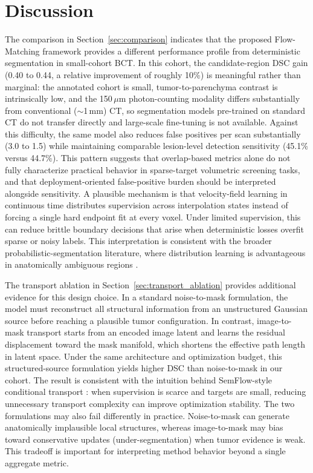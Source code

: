 \documentclass{iopjournal}
\begin{document}
\section{Discussion}
The comparison in Section~\ref{sec:comparison} indicates that the proposed Flow-Matching framework provides a different performance profile from deterministic segmentation in small-cohort BCT. In this cohort, the candidate-region DSC gain (0.40 to 0.44, a relative improvement of roughly 10\%) is meaningful rather than marginal: the annotated cohort is small, tumor-to-parenchyma contrast is intrinsically low, and the 150\,$\mu$m photon-counting modality differs substantially from conventional ($\sim$1\,mm) CT, so segmentation models pre-trained on standard CT do not transfer directly and large-scale fine-tuning is not available. Against this difficulty, the same model also reduces false positives per scan substantially (3.0 to 1.5) while maintaining comparable lesion-level detection sensitivity (45.1\% versus 44.7\%). This pattern suggests that overlap-based metrics alone do not fully characterize practical behavior in sparse-target volumetric screening tasks, and that deployment-oriented false-positive burden should be interpreted alongside sensitivity. A plausible mechanism is that velocity-field learning in continuous time distributes supervision across interpolation states instead of forcing a single hard endpoint fit at every voxel. Under limited supervision, this can reduce brittle boundary decisions that arise when deterministic losses overfit sparse or noisy labels. This interpretation is consistent with the broader probabilistic-segmentation literature, where distribution learning is advantageous in anatomically ambiguous regions \cite{schmidt2023probabilistic, wu2024medsegdiff, rahman2023ambiguous}.

The transport ablation in Section~\ref{sec:transport_ablation} provides additional evidence for this design choice. In a standard noise-to-mask formulation, the model must reconstruct all structural information from an unstructured Gaussian source before reaching a plausible tumor configuration. In contrast, image-to-mask transport starts from an encoded image latent and learns the residual displacement toward the mask manifold, which shortens the effective path length in latent space. Under the same architecture and optimization budget, this structured-source formulation yields higher DSC than noise-to-mask in our cohort. The result is consistent with the intuition behind SemFlow-style conditional transport \cite{han2024semflow}: when supervision is scarce and targets are small, reducing unnecessary transport complexity can improve optimization stability. The two formulations may also fail differently in practice. Noise-to-mask can generate anatomically implausible local structures, whereas image-to-mask may bias toward conservative updates (under-segmentation) when tumor evidence is weak. This tradeoff is important for interpreting method behavior beyond a single aggregate metric.
\end{document}
